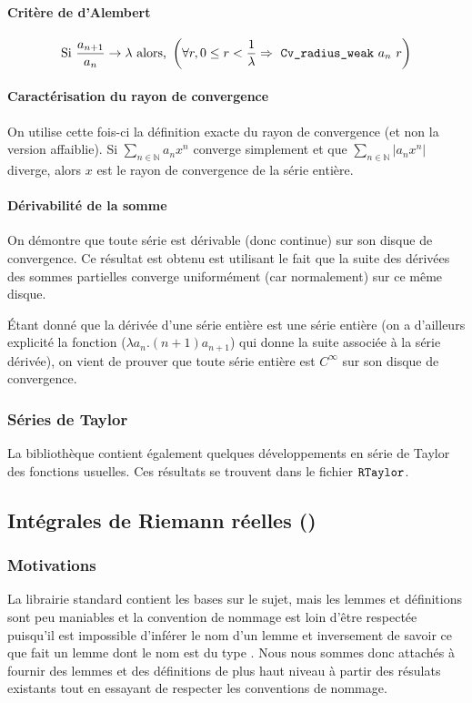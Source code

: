 \paragraph{Critère de d'Alembert} $$\text{Si } \frac{a_{n + 1}}{a_n} \rightarrow \lambda \text{ alors, } \left( \forall r, 0 \le r < \frac{1}{\lambda} \Rightarrow \text{ \texttt{Cv\_radius\_weak} } a_n~ r\right)$$

\paragraph{Caractérisation du rayon de convergence} On utilise cette fois-ci la définition exacte du rayon de convergence (et non la version affaiblie). Si $\sum_{n\in \mathbb{N}} a_n x^n$ converge simplement et que $\sum_{n\in \mathbb{N}} |a_n x^n|$ diverge, alors $x$ est le rayon de convergence de la série entière.

\paragraph{Dérivabilité de la somme} On démontre que toute série est dérivable (donc continue) sur son disque de convergence. Ce résultat est obtenu est utilisant le fait que la suite des dérivées des sommes partielles converge uniformément (car normalement) sur ce même disque.

Étant donné que la dérivée d'une série entière est une série entière (on a d'ailleurs explicité la fonction  ($\lambda a_n.(n+1)a_{n+1}$) qui donne la suite associée à la série dérivée), on vient de prouver que toute série entière est $C^{\infty}$ sur son disque de convergence.

\subsubsection{Séries de Taylor}

La bibliothèque contient également quelques développements en série de Taylor des fonctions usuelles. Ces résultats se trouvent dans le fichier $\texttt{RTaylor}$.

\subsection{Intégrales de Riemann réelles ()}

\subsubsection{Motivations}
	La librairie standard contient les bases sur le sujet, mais les lemmes et définitions sont peu maniables et la convention de nommage est loin d'être respectée puisqu'il est impossible d'inférer le nom d'un lemme et inversement de savoir ce que fait un lemme dont le nom est du type .
	Nous nous sommes donc attachés à fournir des lemmes et des définitions de plus haut niveau à partir des résulats existants tout en essayant de respecter les conventions de nommage.


